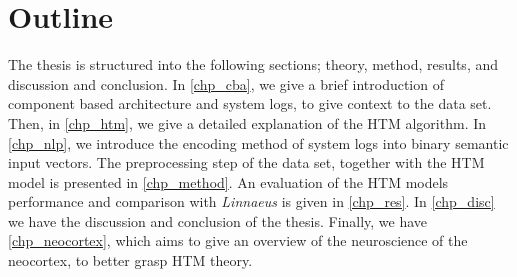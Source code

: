 \section{Outline}
The thesis is structured into the following sections; theory, method, results, and discussion and conclusion. In \autoref{chp_cba}, we give a brief introduction of component based architecture and system logs, to give context to the data set. Then, in \autoref{chp_htm}, we give a detailed explanation of the HTM algorithm. In \autoref{chp_nlp}, we introduce the encoding method of system logs into binary semantic input vectors. The preprocessing step of the data set, together with the HTM model is presented in \autoref{chp_method}. An evaluation of the HTM models performance and comparison with \textit{Linnaeus} is given in \autoref{chp_res}. In \autoref{chp_disc} we have the discussion and conclusion of the thesis. Finally, we have \autoref{chp_neocortex}, which aims to give an overview of the neuroscience of the neocortex, to better grasp HTM theory.
